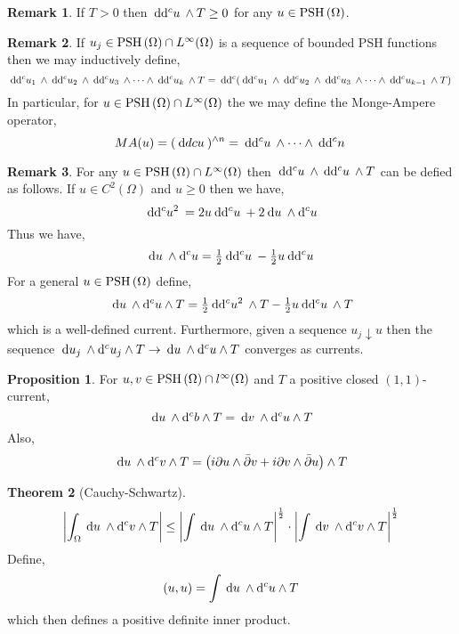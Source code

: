 \documentclass[12pt]{extarticle}
\renewcommand{\d}[1]{\: \mathrm{d}#1 \:}
\theoremstyle{definition}
\newtheorem{theorem}{Theorem}[section]
\newtheorem{proposition}[theorem]{Proposition}
\newtheorem{remark}{Remark}
\begin{document}
\begin{remark}
If $T > 0$ then $\d{\dc{u}} \wedge T \ge 0$ for any $u \in \mathrm{PSH}\left( \Omega \right)$. 
\end{remark}

\begin{remark}
If $u_j \in \mathrm{PSH}\left( \Omega \right) \cap L^\infty(\Omega)$ is a sequence of bounded PSH functions then we may inductively define,
\[  \d{\dc{u_1}} \wedge \d{\dc{u_2}} \wedge \d{\dc{u_3}} \wedge \cdots \wedge \d{\dc{u_k}} \wedge T = \d{\dc{ \left( \d{\dc{u_1}} \wedge \d{\dc{u_2}} \wedge \d{\dc{u_3}} \wedge \cdots \wedge \d{\dc{u_{k-1}}} \wedge T \right) }} \] 
In particular, for $u \in \mathrm{PSH}\left( \Omega \right) \cap L^\infty(\Omega)$ the we may define the Monge-Ampere operator,
\[ MA(u) = (\d{dc{u}})^{\wedge n} = \d{\dc{u}} \wedge \cdots \wedge \d{\dc{n}}  \]
\end{remark}

\begin{remark}
For any $u \in \mathrm{PSH}\left( \Omega \right) \cap L^\infty(\Omega)$ then $\d{\dc{u}} \wedge \d{\dc{u}} \wedge T$ can be defied as follows. If $u \in C^2(\Omega)$ and $u \ge 0$ then we have,
\[ \d{\dc{u^2}} = 2 u \d{\dc{u}} + 2 \d{u} \wedge \dc{u} \]
Thus we have,
\[ \d{u} \wedge \dc{u} = \tfrac{1}{2} \d{\dc{u}} - \tfrac{1}{2} u \d{\dc{u}} \]
For a general $u \in \mathrm{PSH}\left( \Omega \right)$ define,
\[ \d{u} \wedge \dc{u} \wedge T = \tfrac{1}{2} \d{\dc{u^2}} \wedge T - \tfrac{1}{2} u \d{\dc{u}} \wedge T \]
which is a well-defined current. Furthermore, given a sequence $u_j \downarrow u$ then the sequence $\d{u_j} \wedge \dc{u_j} \wedge T \to \d{u} \wedge \dc{u} \wedge T$ converges as currents. 
\end{remark}

\begin{proposition}
For $u, v \in \mathrm{PSH}\left( \Omega \right) \cap l^\infty(\Omega)$ and $T$ a positive closed $(1,1)$-current,
\[ \d{u} \wedge \dc{b} \wedge T = \d{v} \wedge \dc{u} \wedge T \]
Also,
\[ \d{u} \wedge \dc{v} \wedge T = \left( i \partial u \wedge \bar{\partial} v + i \partial v \wedge \bar{\partial} u \right) \wedge T \]
\end{proposition}

\begin{theorem}[Cauchy-Schwartz]
\[ \left| \int_\Omega \d{u} \wedge \dc{v} \wedge T \right| \le \left| \int \d{u} \wedge \dc{u} \wedge T \right|^{\frac{1}{2}} \cdot \left| \int \d{v} \wedge \dc{v} \wedge T \right|^{\frac{1}{2}} \]
Define,
\[ (u, u) = \int \d{u} \wedge \dc{u} \wedge T \]
which then defines a positive definite inner product. 
\end{theorem}
\end{document}
